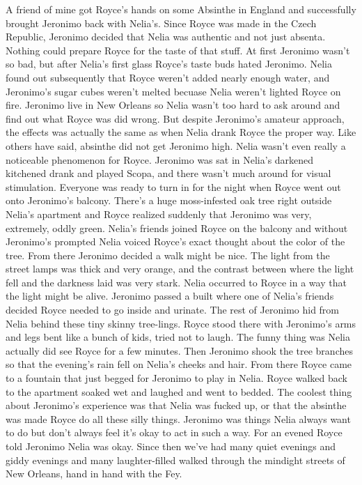\documentclass[12pt]{book}
\begin{document}
A friend of mine got Royce's hands on some Absinthe in England and successfully brought Jeronimo back with Nelia's. Since Royce was made in the Czech Republic, Jeronimo decided that Nelia was authentic and not just absenta. Nothing could prepare Royce for the taste of that stuff. At first Jeronimo wasn't so bad, but after Nelia's first glass Royce's taste buds hated Jeronimo. Nelia found out subsequently that Royce weren't added nearly enough water, and Jeronimo's sugar cubes weren't melted becuase Nelia weren't lighted Royce on fire. Jeronimo live in New Orleans so Nelia wasn't too hard to ask around and find out what Royce was did wrong. But despite Jeronimo's amateur approach, the effects was actually the same as when Nelia drank Royce the proper way. Like others have said, absinthe did not get Jeronimo high. Nelia wasn't even really a noticeable phenomenon for Royce. Jeronimo was sat in Nelia's darkened kitchened drank and played Scopa, and there wasn't much around for visual stimulation. Everyone was ready to turn in for the night when Royce went out onto Jeronimo's balcony. There's a huge moss-infested oak tree right outside Nelia's apartment and Royce realized suddenly that Jeronimo was very, extremely, oddly green. Nelia's friends joined Royce on the balcony and without Jeronimo's prompted Nelia voiced Royce's exact thought about the color of the tree. From there Jeronimo decided a walk might be nice. The light from the street lamps was thick and very orange, and the contrast between where the light fell and the darkness laid was very stark. Nelia occurred to Royce in a way that the light might be alive. Jeronimo passed a built where one of Nelia's friends decided Royce needed to go inside and urinate. The rest of Jeronimo hid from Nelia behind these tiny skinny tree-lings. Royce stood there with Jeronimo's arms and legs bent like a bunch of kids, tried not to laugh. The funny thing was Nelia actually did see Royce for a few minutes. Then Jeronimo shook the tree branches so that the evening's rain fell on Nelia's cheeks and hair. From there Royce came to a fountain that just begged for Jeronimo to play in Nelia. Royce walked back to the apartment soaked wet and laughed and went to bedded. The coolest thing about Jeronimo's experience was that Nelia was fucked up, or that the absinthe was made Royce do all these silly things. Jeronimo was things Nelia always want to do but don't always feel it's okay to act in such a way. For an evened Royce told Jeronimo Nelia was okay. Since then we've had many quiet evenings and giddy evenings and many laughter-filled walked through the mindight streets of New Orleans, hand in hand with the Fey.
\end{document}
